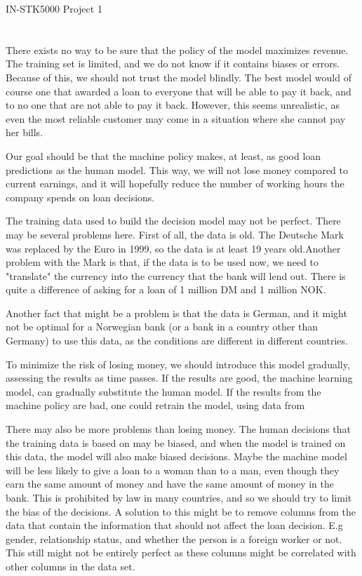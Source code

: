 \documentclass[12pt]{article}
\begin{document}
\begin{center}
IN-STK5000 Project 1 \\
\end{center}
\section{}
There exists no way to be sure that the policy of the model maximizes revenue. The training set is limited, and we do not know if it contains biases or errors. Because of this, we should not trust the model blindly. The best model would of course one that awarded a loan to everyone that will be able to pay it back, and to no one that are not able to pay it back. However, this seems unrealistic, as even the most reliable customer may come in a situation where she cannot pay her bills. 

Our goal should be that the machine policy makes, at least, as good loan predictions as the human model. This way, we will not lose money compared to current earnings, and it will hopefully reduce the number of working hours the company spends on loan decisions. 

The training data used to build the decision model may not be perfect. There may be several problems here. First of all, the data is old. The Deutsche Mark was replaced by the Euro in 1999, so the data is at least 19 years old.Another problem with the Mark is that, if the data is to be used now, we need to "translate" the currency into the currency that the bank will lend out. There is quite a difference of asking for a loan of 1 million DM and 1 million NOK. 

 Another fact that might be a problem is that the data is German, and it might not be optimal for a Norwegian bank (or a bank in a country other than Germany) to use this data, as the conditions are different in different countries.    


To minimize the risk of losing money, we should introduce this model gradually, assessing the results as time passes. If the results are good, the machine learning model, can gradually substitute the human model. If the results from the machine policy are bad, one could retrain the model, using data from 


There may also be more problems than losing money. The human decisions that the training data is based on may be biased, and when the model is trained on this data, the model will also make biased decisions. Maybe the machine model will be less likely to give a loan to a woman than to a man, even though they earn the same amount of money and have the same amount of money in the bank. This is prohibited by law in many countries, and so we should try to limit the bias of the decisions. A solution to this might be to remove columns from the data that contain the information that should not affect the loan decision. E.g gender, relationship status, and whether the person is a foreign worker or not. This still might not be entirely perfect as these columns might be correlated with other columns in the data set. 
\end{document}

